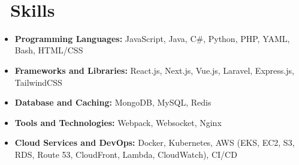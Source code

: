 \documentclass{resume}
\begin{document}


   \textperiodcentered\

  \section{\faCogs\ Skills}
  \begin{itemize}[parsep=0.5ex]
    \item \textbf{Programming Languages:} JavaScript, Java, C\#, Python, PHP, YAML, Bash, HTML/CSS
    \item \textbf{Frameworks and Libraries:} React.js, Next.js, Vue.js, Laravel, Express.js, TailwindCSS
    \item \textbf{Database and Caching:} MongoDB, MySQL, Redis
    \item \textbf{Tools and Technologies:} Webpack, Websocket, Nginx
    \item \textbf{Cloud Services and DevOps:} Docker, Kubernetes, AWS (EKS, EC2, S3, RDS, Route 53, CloudFront, Lambda, CloudWatch), CI/CD
  \end{itemize}
\end{document}
